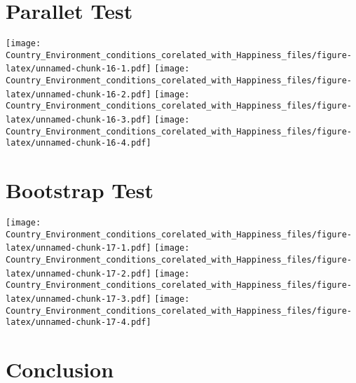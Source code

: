 \documentclass[]{book}
\begin{document}
\hypertarget{parallet-test}{%
\section{Parallet Test}\label{parallet-test}}

\texttt{[image: Country\_Environment\_conditions\_corelated\_with\_Happiness\_files/figure-latex/unnamed-chunk-16-1.pdf]}
\texttt{[image: Country\_Environment\_conditions\_corelated\_with\_Happiness\_files/figure-latex/unnamed-chunk-16-2.pdf]}
\texttt{[image: Country\_Environment\_conditions\_corelated\_with\_Happiness\_files/figure-latex/unnamed-chunk-16-3.pdf]}
\texttt{[image: Country\_Environment\_conditions\_corelated\_with\_Happiness\_files/figure-latex/unnamed-chunk-16-4.pdf]}

\hypertarget{bootstrap-test}{%
\section{Bootstrap Test}\label{bootstrap-test}}

\texttt{[image: Country\_Environment\_conditions\_corelated\_with\_Happiness\_files/figure-latex/unnamed-chunk-17-1.pdf]}
\texttt{[image: Country\_Environment\_conditions\_corelated\_with\_Happiness\_files/figure-latex/unnamed-chunk-17-2.pdf]}
\texttt{[image: Country\_Environment\_conditions\_corelated\_with\_Happiness\_files/figure-latex/unnamed-chunk-17-3.pdf]}
\texttt{[image: Country\_Environment\_conditions\_corelated\_with\_Happiness\_files/figure-latex/unnamed-chunk-17-4.pdf]}

\hypertarget{conclusion}{%
\section{Conclusion}\label{conclusion}}
\end{document}

